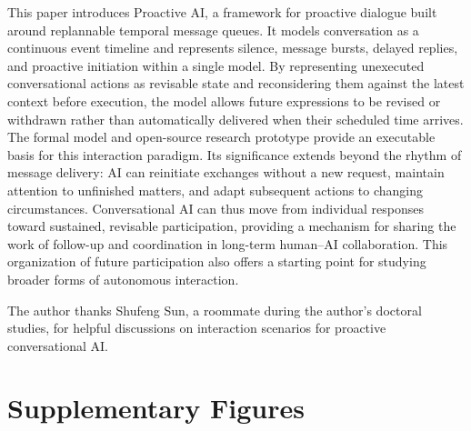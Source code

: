 \documentclass[manuscript,nonacm]{acmart}
\begin{document}
This paper introduces Proactive AI, a framework for proactive dialogue built
around replannable temporal message queues. It models conversation as a
continuous event timeline and represents silence, message bursts, delayed
replies, and proactive initiation within a single model.
By representing unexecuted conversational actions as revisable state and
reconsidering them against the latest context before execution, the model allows
future expressions to be revised or withdrawn rather than automatically
delivered when their scheduled time arrives. The formal model and open-source
research prototype provide an executable basis for this interaction paradigm.
Its significance extends beyond the rhythm of message delivery: AI can reinitiate
exchanges without a new request, maintain attention to unfinished matters, and
adapt subsequent actions to changing circumstances. Conversational AI can thus
move from individual responses toward sustained, revisable participation,
providing a mechanism for sharing the work of follow-up and coordination in
long-term human--AI collaboration. This organization of future participation also
offers a starting point for studying broader forms of autonomous interaction.

\begin{acks}
The author thanks Shufeng Sun, a roommate during the author's doctoral studies,
for helpful discussions on interaction scenarios for proactive conversational AI.
\end{acks}




\clearpage
\appendix
\section{Supplementary Figures}
\label{app:supplementary-figures}
\setcounter{figure}{0}
\renewcommand{\theHfigure}{supp.\arabic{figure}}
\captionsetup[figure]{name=Supplementary Figure}
\end{document}
